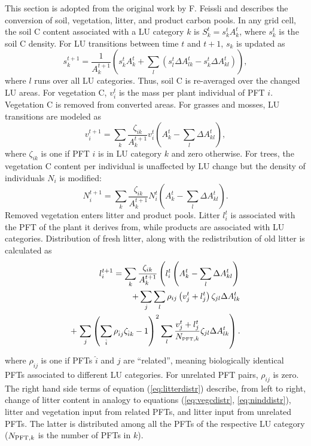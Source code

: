This section is adopted from the original work by F. Feissli and describes the conversion of soil, vegetation, litter, and product carbon pools. In any grid cell, the soil C content associated with a LU category $k$ is $S_k^t = s_k^t A_k^t$, where $s_k^t$ is the soil C density. For LU transitions between time $t$ and $t+1$, $s_k$ is updated as
\begin{equation}
 s_k^{t+1}= \frac{1}{A_k^{t+1}} \left(s_k^t A_k^t + \sum_l \left(s_l^t \Delta A_{lk}^t - s_k^t \Delta A_{kl}^t\right)\right), 
\end{equation}
\noindent
where $l$ runs over all LU categories. Thus, soil C is re-averaged over the changed LU areas. For vegetation C, $v_i^t$ is the mass per plant individual of PFT $i$. Vegetation C is removed from converted areas. For grasses and mosses, LU transitions are modeled as
\begin{equation}
 v_i^{t+1}= \sum_k \frac{\zeta_{ik}}{A_{k}^{t+1}} v_i^t \left(A_k^t - \sum_l \Delta A_{kl}^t \right),
\label{eq:vegcdistr}
\end{equation}
\noindent
where $\zeta_{ik}$  is one if PFT $i$ is in LU category $k$ and zero otherwise. For trees, the vegetation C content per individual is unaffected by LU change but the density of individuals $N_i$ is modified:
\begin{equation}
 N_i^{t+1}= \sum_k \frac{\zeta_{ik}}{A_{k}^{t+1}} N_i^t \left(A_{k}^t - \sum_l\Delta A_{kl}^t\right).
\label{eq:ninddistr}
\end{equation}
Removed vegetation enters litter and product pools. Litter $l_i^{t}$ is associated with the PFT of the plant it derives from, while products are associated with LU categories. Distribution of fresh litter, along with the redistribution of old litter is calculated as
\begin{eqnarray}
  l_i^{t+1} = \sum_k  \frac{\zeta_{ik}}{A_{k}^{t+1}}\left( l_i^t \left(A_k^t - \sum_l \Delta A_{kl}^t \right) \right. \nonumber \\
  +\sum_j \sum_l \rho_{ij} \left(v_j^t+l_j^t\right)  \zeta_{jl} \Delta A_{lk}^t \nonumber \\
  +\left.\sum_j \left(\sum_{\hat{i}}\rho_{\hat{i}j}\zeta_{\hat{i}k}-1 \right)^2 \sum_l \frac{v_j^t+l_j^t}{N_{\mbox{\tiny PFT},{k}}} \zeta_{jl} \Delta A_{lk}^t  \right).
\label{eq:litterdistr}
\end{eqnarray}
\noindent
where $\rho_{\hat{i}j}$ is one if PFTs $\hat{i}$ and $j$ are ``related'', meaning biologically identical PFTs associated to different LU categories. For unrelated PFT pairs, $\rho_{ij}$ is zero. The right hand side terms of equation (\ref{eq:litterdistr}) describe, from left to right, change of litter content in analogy to equations (\ref{eq:vegcdistr}, \ref{eq:ninddistr}), litter and vegetation input from related PFTs, and litter input from unrelated PFTs. The latter is distributed among all the PFTs of the respective LU category ($N_{\mbox{\scriptsize PFT},k}$ is the number of PFTs in $k$).\\
